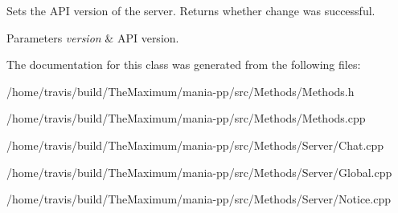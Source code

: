 Sets the A\-P\-I version of the server. Returns whether change was successful. 


\begin{DoxyParams}{Parameters}
{\em version} & A\-P\-I version. \\
\hline
\end{DoxyParams}


The documentation for this class was generated from the following files\-:\begin{DoxyCompactItemize}
\item 
/home/travis/build/\-The\-Maximum/mania-\/pp/src/\-Methods/Methods.\-h\item 
/home/travis/build/\-The\-Maximum/mania-\/pp/src/\-Methods/Methods.\-cpp\item 
/home/travis/build/\-The\-Maximum/mania-\/pp/src/\-Methods/\-Server/Chat.\-cpp\item 
/home/travis/build/\-The\-Maximum/mania-\/pp/src/\-Methods/\-Server/Global.\-cpp\item 
/home/travis/build/\-The\-Maximum/mania-\/pp/src/\-Methods/\-Server/Notice.\-cpp\end{DoxyCompactItemize}
